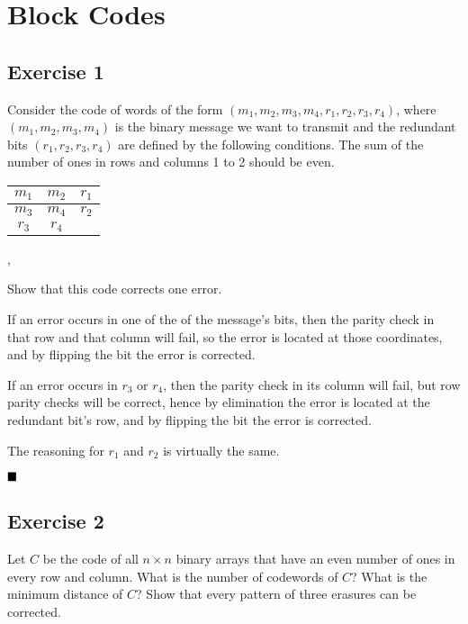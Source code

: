 \section{Block Codes}

\subsection{Exercise 1}

\begin{formulationBox}
	Consider the code of words of the form $(m_1, m_2, m_3, m_4, r_1, r_2, r_3, r_4)$, where $(m_1, m_2, m_3, m_4)$ is the binary message we want to transmit and the redundant bits $(r_1, r_2, r_3, r_4)$ are defined by the following conditions. The sum of the number of ones in rows and columns 1 to 2 should be even.
	
	\begin{center}
		\begin{tabular}{|c|c|c|}
			\hline
			$m_1$ & $m_2$ & $r_1$\\
			\hline
			$m_3$ & $m_4$ & $r_2$\\
			\hline
			$r_3$ & $r_4$ \\
			\cline{1-2}
		\end{tabular},
	\end{center}
	
	Show that this code corrects one error.
\end{formulationBox}

If an error occurs in one of the of the message's bits, then the parity check in that row and that column will fail, so the error is located at those coordinates, and by flipping the bit the error is corrected.

If an error occurs in $r_3$ or $r_4$, then the parity check in its column will fail, but row parity checks will be correct, hence by elimination the error is located at the redundant bit's row, and by flipping the bit the error is corrected.

The reasoning for $r_1$ and $r_2$ is virtually the same.

$\qed$

\subsection{Exercise 2}

\begin{formulationBox}
	Let $C$ be the code of all $n \times n$ binary arrays that have an even number of ones in every row and column. What is the number of codewords of $C$? What is the minimum distance of $C$? Show that every pattern of three erasures can be corrected.
\end{formulationBox}

